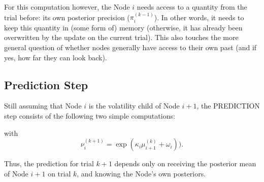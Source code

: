 \noindent
{}%
\vspace{0.5cm}

\noindent
For this computation however, the Node $i$ needs access to a quantity from the trial before: its own posterior precision ($\pi_i^{(k-1)}$). In other words, it needs to keep this quantity in (some form of) memory (otherwise, it has already been overwritten by the update on the current trial). This also touches the more general question of whether nodes generally have access to their own past (and if yes, how far they can look back).


\subsection{Prediction Step}
Still assuming that Node $i$ is the volatility child of Node $i+1$, the \textsf{PREDICTION step} consists of the following two simple computations:
\vspace{0.5cm}

\noindent
{}%
\vspace{0.5cm}

\noindent
with
\begin{equation*}
\nu_i^{(k+1)} = \exp(\kappa_i \mu_{i+1}^{(k)} + \omega_i)).
\end{equation*}

Thus, the prediction for trial $k+1$ depends only on receiving the posterior mean of Node $i+1$ on trial $k$, and knowing the Node's own posteriors.\\

